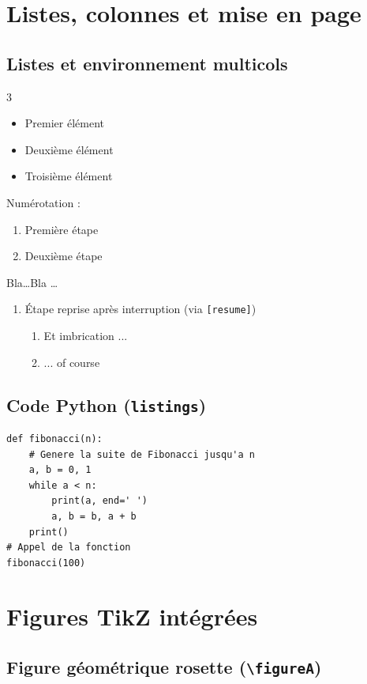 \documentclass{poly}
\begin{document}
\section{Listes, colonnes et mise en page}

\subsection{Listes et environnement multicols}
\begin{multicols}{3}
	\begin{itemize}
		\item Premier élément
		\item Deuxième élément
		\item Troisième élément
	\end{itemize}
\end{multicols}

Numérotation :
\begin{enumerate}
	\item Première étape
	\item Deuxième étape
\end{enumerate}
Bla\ldots Bla \ldots
\begin{enumerate}[resume]
	\item Étape reprise après interruption (via \texttt{[resume]})
	      \begin{enumerate}
		      \item Et imbrication ...
		      \item ... of course
	      \end{enumerate}
\end{enumerate}

\subsection{Code Python (\texttt{listings})}
\begin{lstlisting}
def fibonacci(n):
    # Genere la suite de Fibonacci jusqu'a n
    a, b = 0, 1
    while a < n:
        print(a, end=' ')
        a, b = b, a + b
    print()
# Appel de la fonction
fibonacci(100)
\end{lstlisting}

\newpage
\section{Figures TikZ intégrées}

\subsection{Figure géométrique rosette (\texttt{\textbackslash figureA})}
\end{document}
